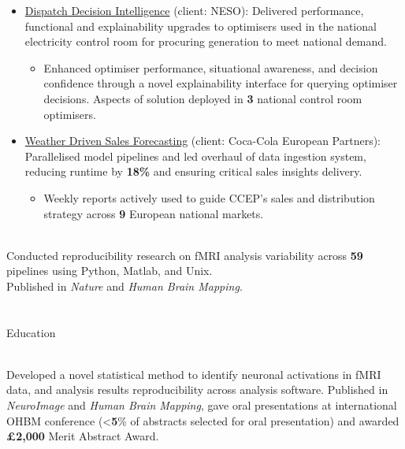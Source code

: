 \documentclass{my_cv}
\begin{document}
{\begin{itemize}[topsep=2pt,itemsep=3pt,partopsep=0pt, parsep=0pt]
    \item \href{https://www.smithinst.co.uk/case-studies/modernising-optimisation-algorithms-for-the-control-room/}{Dispatch Decision Intelligence} (client: NESO): Delivered performance, functional and explainability upgrades to optimisers used in the national electricity control room for procuring generation to meet national demand.
      	\begin{itemize}[topsep=0pt,itemsep=0pt,partopsep=0pt,parsep=0pt]
            \item Enhanced optimiser performance, situational awareness, and decision confidence through a novel explainability interface for querying optimiser decisions. Aspects of solution deployed in \textbf{3} national control room optimisers. 
        \end{itemize}
    \item \href{https://www.smithinst.co.uk/case-studies/forecasting-how-weather-drives-coca-cola-europacific-partner-sales/}{Weather Driven Sales Forecasting} (client: Coca-Cola European Partners): Parallelised model pipelines and led overhaul of data ingestion system, reducing runtime by \textbf{18\%} and ensuring critical sales insights delivery.
          	\begin{itemize}[topsep=0pt,itemsep=0pt,partopsep=0pt,parsep=0pt]
            \item Weekly reports actively used to guide CCEP's sales and distribution strategy across \textbf{9} European national markets. 
        \end{itemize}
\end{itemize} 
}
%
\\ Conducted reproducibility research on fMRI analysis variability across \textbf{59} pipelines using Python, Matlab, and Unix. \\
Published in \textit{Nature} and \textit{Human Brain Mapping}.
\vspace{-0.2cm}     
     
\section{\faGraduationCap}{Education}

%
\\ Developed a novel statistical method to identify neuronal activations in fMRI data, and analysis results reproducibility across analysis software. Published in \textit{NeuroImage} and \textit{Human Brain Mapping}, gave oral presentations at international OHBM conference (<\textbf{5}\% of abstracts selected for oral presentation) and awarded \textbf{£2,000} Merit Abstract Award.
\end{document}
